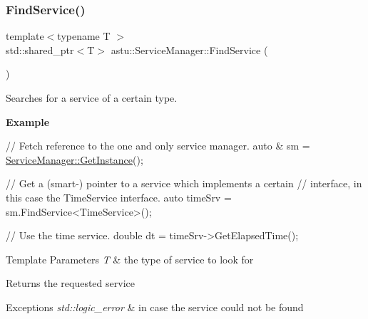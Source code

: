 \subsubsection{\texorpdfstring{Find\+Service()}{FindService()}\hspace{0.1cm}{\footnotesize\ttfamily [1/2]}}
{\footnotesize\ttfamily template$<$typename T $>$ \\
std\+::shared\+\_\+ptr$<$T$>$ astu\+::\+Service\+Manager\+::\+Find\+Service (\begin{DoxyParamCaption}{ }\end{DoxyParamCaption})\hspace{0.3cm}{\ttfamily [inline]}}

Searches for a service of a certain type.

{\bfseries Example}


\begin{DoxyCode}
\textcolor{comment}{// Fetch reference to the one and only service manager.}
\textcolor{keyword}{auto} & sm = \hyperlink{classastu_1_1ServiceManager_a26941fe98ea3f2792deca62e4124bf15}{ServiceManager::GetInstance}();

\textcolor{comment}{// Get a (smart-) pointer to a service which implements a certain}
\textcolor{comment}{// interface, in this case the TimeService interface.}
\textcolor{keyword}{auto} timeSrv = sm.FindService<TimeService>();

\textcolor{comment}{// Use the time service.}
\textcolor{keywordtype}{double} dt = timeSrv->GetElapsedTime();
\end{DoxyCode}



\begin{DoxyTemplParams}{Template Parameters}
{\em T} & the type of service to look for \\
\hline
\end{DoxyTemplParams}
\begin{DoxyReturn}{Returns}
the requested service 
\end{DoxyReturn}

\begin{DoxyExceptions}{Exceptions}
{\em std\+::logic\+\_\+error} & in case the service could not be found \\
\hline
\end{DoxyExceptions}
\mbox{\label{classastu_1_1ServiceManager_a3000933260f102748f75c9b4064fd119}} 
